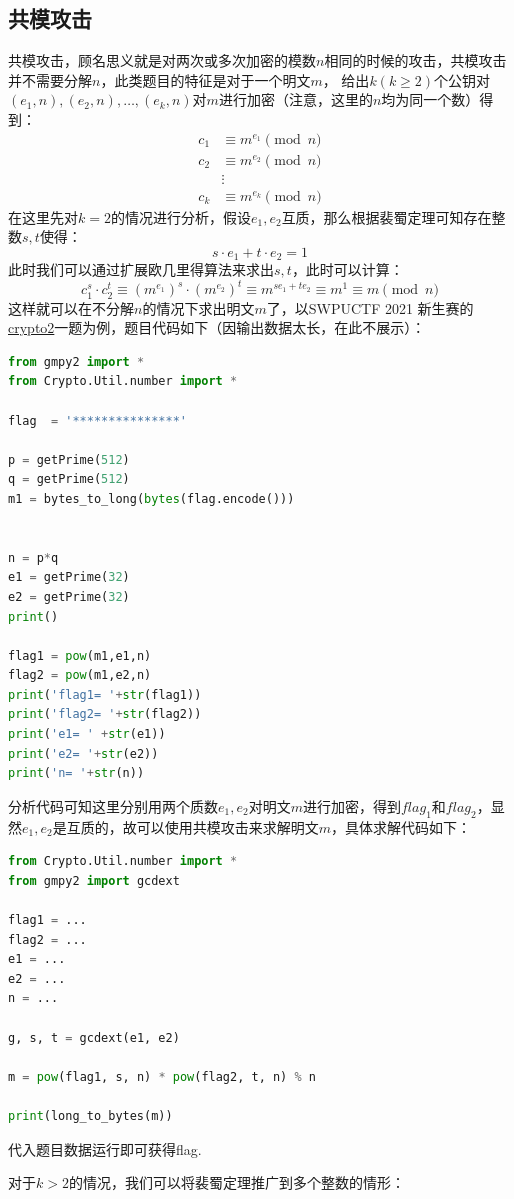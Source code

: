 \documentclass{book}
\numberwithin{equation}{subsubsection}
\begin{document}
\subsection{共模攻击}
共模攻击，顾名思义就是对两次或多次加密的模数$n$相同的时候的攻击，共模攻击并不需要分解$n$，此类题目的特征是对于一个明文$m$，
给出$k(k\ge2)$个公钥对$(e_1,n),(e_2,n),\ldots,(e_k,n)$对$m$进行加密（注意，这里的$n$均为同一个数）得到：
\begin{equation}
    \begin{aligned}
        c_1&\equiv m^{e_1}\pmod{n}\\
        c_2&\equiv m^{e_2}\pmod{n}\\
        &\vdots\\
        c_k&\equiv m^{e_k}\pmod{n}
    \end{aligned}
    \nonumber
\end{equation}
在这里先对$k=2$的情况进行分析，假设$e_1,e_2$互质，那么根据裴蜀定理可知存在整数$s,t$使得：
\begin{equation}
    s\cdot e_1+t\cdot e_2=1
    \nonumber
\end{equation}
此时我们可以通过扩展欧几里得算法来求出$s,t$，此时可以计算：
\begin{equation}
    c_1^s \cdot c_2^t \equiv (m^{e_1})^s \cdot (m^{e_2})^t \equiv m^{s e_1 + t e_2} \equiv m^1 \equiv m \pmod{n}
    \nonumber
\end{equation}
这样就可以在不分解$n$的情况下求出明文$m$了，以SWPUCTF 2021 新生赛的\href{https://www.nssctf.cn/problem/413}{crypto2}一题为例，题目代码如下（因输出数据太长，在此不展示）：
\begin{lstlisting}[language=Python,basicstyle=\ttfamily,breaklines=true,keywordstyle=\bfseries\color{blue}]
from gmpy2 import *
from Crypto.Util.number import *

flag  = '***************'

p = getPrime(512)
q = getPrime(512)
m1 = bytes_to_long(bytes(flag.encode()))


n = p*q
e1 = getPrime(32)
e2 = getPrime(32)
print()

flag1 = pow(m1,e1,n)
flag2 = pow(m1,e2,n)
print('flag1= '+str(flag1))
print('flag2= '+str(flag2))
print('e1= ' +str(e1))
print('e2= '+str(e2))
print('n= '+str(n))
\end{lstlisting}
分析代码可知这里分别用两个质数$e_1,e_2$对明文$m$进行加密，得到$flag_1$和$flag_2$，显然$e_1,e_2$是互质的，故可以使用共模攻击来求解明文$m$，具体求解代码如下：
\begin{lstlisting}[language=Python,basicstyle=\ttfamily,breaklines=true,keywordstyle=\bfseries\color{blue}]
from Crypto.Util.number import *
from gmpy2 import gcdext

flag1 = ...
flag2 = ...
e1 = ...
e2 = ...
n = ...

g, s, t = gcdext(e1, e2)

m = pow(flag1, s, n) * pow(flag2, t, n) % n

print(long_to_bytes(m))
\end{lstlisting}
代入题目数据运行即可获得flag.\par
对于$k>2$的情况，我们可以将裴蜀定理推广到多个整数的情形：
\end{document}
